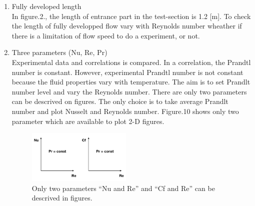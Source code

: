 \documentclass[conference]{IEEEtran}
\begin{document}
\begin{enumerate}
\newpage
  \item Fully developed length\\
  In figure.2., the length of entrance part in the test-section is 1.2 [m].
  To check the length of fully developped flow vary with Reynolds number wheather if there is a limitation of
flow speed to do a experiment, or not.\\
  \item Three parameters (Nu, Re, Pr)\\
  Experimental data and correlations is compared.
  In a correlation, the Prandtl number is constant.
  However, experimental Prandtl number is not constant because the fluid properties vary with temperature.
  The aim is to set Prandlt number level and vary the Reynolds number.
  There are only two parameters can be descrived on figures.
  The only choice is to take average Prandlt number and plot Nusselt and Reynolds number.
  Figure.10 shows only two parameter which are available to plot 2-D figures.
\begin{figure}[h]
\vspace{-2zh}
  \centering
  \includegraphics[width=0.47\textwidth,natwidth=750,natheight=300]{fig/three_parameters.png}
  \caption{Only two parameters ``Nu and Re'' and ``Cf and Re'' can be descrived in figures.}
  \label{three_parameters}
  \vspace{0zh}
\end{figure}


\end{enumerate}
\end{document}
